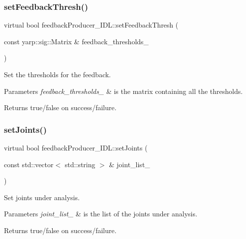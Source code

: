\subsubsection{\texorpdfstring{set\+Feedback\+Thresh()}{setFeedbackThresh()}}
{\footnotesize\ttfamily virtual bool feedback\+Producer\+\_\+\+I\+D\+L\+::set\+Feedback\+Thresh (\begin{DoxyParamCaption}\item[{const yarp\+::sig\+::\+Matrix \&}]{feedback\+\_\+thresholds\+\_\+ }\end{DoxyParamCaption})\hspace{0.3cm}{\ttfamily [virtual]}}



Set the thresholds for the feedback. 


\begin{DoxyParams}{Parameters}
{\em feedback\+\_\+thresholds\+\_\+} & is the matrix containing all the thresholds. \\
\hline
\end{DoxyParams}
\begin{DoxyReturn}{Returns}
true/false on success/failure. 
\end{DoxyReturn}
\mbox{\label{classfeedbackProducer__IDL_a13778ed7bd818fb0093565ff99d936a6}} 
\subsubsection{\texorpdfstring{set\+Joints()}{setJoints()}}
{\footnotesize\ttfamily virtual bool feedback\+Producer\+\_\+\+I\+D\+L\+::set\+Joints (\begin{DoxyParamCaption}\item[{const std\+::vector$<$ std\+::string $>$ \&}]{joint\+\_\+list\+\_\+ }\end{DoxyParamCaption})\hspace{0.3cm}{\ttfamily [virtual]}}



Set joints under analysis. 


\begin{DoxyParams}{Parameters}
{\em joint\+\_\+list\+\_\+} & is the list of the joints under analysis. \\
\hline
\end{DoxyParams}
\begin{DoxyReturn}{Returns}
true/false on success/failure. 
\end{DoxyReturn}
\mbox{\label{classfeedbackProducer__IDL_a364738f5e3477e52c76d2a22672d840b}} 
